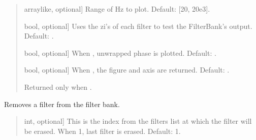 \documentclass[letterpaper,10pt,english]{sphinxmanual}
\begin{document}
\begin{fulllineitems}
\begin{fulllineitems}
\begin{quote}
\begin{description}
\begin{description}
\sphinxlineitem{\sphinxstylestrong{range\_hz}}{[}array\sphinxhyphen{}like, optional{]}
\sphinxAtStartPar
Range of Hz to plot. Default: {[}20, 20e3{]}.

\sphinxlineitem{\sphinxstylestrong{test\_zi}}{[}bool, optional{]}
\sphinxAtStartPar
Uses the zi’s of each filter to test the FilterBank’s output.
Default: .

\sphinxlineitem{\sphinxstylestrong{unwrap}}{[}bool, optional{]}
\sphinxAtStartPar
When , unwrapped phase is plotted. Default: .

\sphinxlineitem{\sphinxstylestrong{returns}}{[}bool, optional{]}
\sphinxAtStartPar
When , the figure and axis are returned. Default: .

\end{description}

\begin{description}
\sphinxAtStartPar
Returned only when .

\end{description}

\end{description}\end{quote}

\end{fulllineitems}


\begin{fulllineitems}
\label{\detokenize{classes:dsptoolbox.classes.filterbank.FilterBank.remove_filter}}
\pysigstartsignatures
{}
\pysigstopsignatures
\sphinxAtStartPar
Removes a filter from the filter bank.
\begin{quote}\begin{description}
\begin{description}
\sphinxlineitem{\sphinxstylestrong{index}}{[}int, optional{]}
\sphinxAtStartPar
This is the index from the filters list at which the filter
will be erased. When \sphinxhyphen{}1, last filter is erased.
Default: \sphinxhyphen{}1.


\end{description}
\end{description}
\end{quote}
\end{fulllineitems}
\end{fulllineitems}
\end{document}
